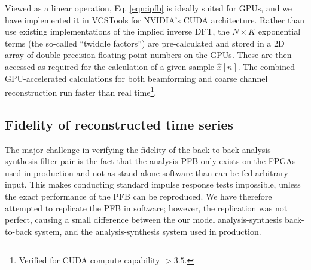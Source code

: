 \documentclass{pasa}%
\newcommand{\vcstools}{VCSTools}
\begin{document}
Viewed as a linear operation, Eq. \eqref{eqn:ipfb} is ideally suited for GPUs, and we have implemented it in \vcstools{} for NVIDIA's CUDA architecture.
Rather than use existing implementations of the implied inverse DFT, the $N \times K$ exponential terms (the so-called ``twiddle factors'') are pre-calculated and stored in a 2D array of double-precision floating point numbers on the GPUs.
These are then accessed as required for the calculation of a given sample $\hat{x}[n]$.
The combined GPU-accelerated calculations for both beamforming and coarse channel reconstruction run faster than real time\footnote{Verified for CUDA compute capability $>3.5$.}.

\subsection{Fidelity of reconstructed time series}
\label{sec:fidelity}

The major challenge in verifying the fidelity of the back-to-back analysis-synthesis filter pair is the fact that the analysis PFB only exists on the FPGAs used in production and not as stand-alone software than can be fed arbitrary input.
This makes conducting standard impulse response tests impossible, unless the exact performance of the PFB can be reproduced.
We have therefore attempted to replicate the PFB in software; however, the replication was not perfect, causing a small difference between the our model analysis-synthesis back-to-back system, and the analysis-synthesis system used in production.
\end{document}
